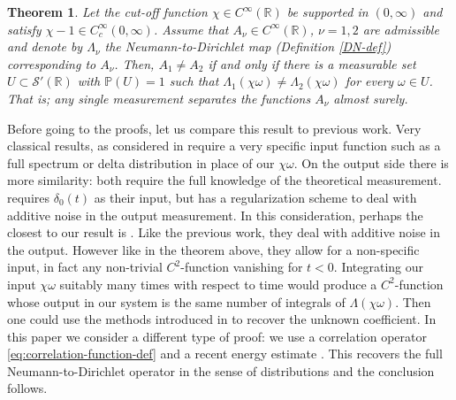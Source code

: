 \documentclass[10pt,a4paper]{article}
\theoremstyle{plain}
\newtheorem{theorem}{Theorem}[section]
\theoremstyle{definition}
\theoremstyle{remark}
\numberwithin{equation}{section}
\newcommand{\R}{\mathbb{R}}
\begin{document}
\begin{theorem}\label{themain}
Let the cut-off function $\chi \in C^\infty( \R)$ be supported in $(0,\infty)$ and satisfy $\chi-1 \in C^\infty_c(0,\infty)$. 
Assume that $A_\nu \in C^\infty(\R)$, $\nu = 1,2$ are admissible and 
denote by ${\Lambda}_{\nu}$ the Neumann-to-Dirichlet map (Definition \ref{DN-def}) corresponding to $ A_\nu$. 
Then, $A_1 \neq A_2$ if and only if there is a measurable set $U \subset \mathcal{S}'(\R)$ with $\mathbb{P}(U) = 1$  such that 
$\Lambda_{1} ( \chi \omega) \neq \Lambda_{2} ( \chi \omega)$ for every $ \omega \in U$. 
That is; any single measurement separates the functions $A_\nu$ almost surely.
\end{theorem}

{ Before going to the proofs, let us compare this result to previous work. Very classical results, as considered in \cite{gelfand55_deter_differ_equat_from_its_spect_funct,sondhi_gopinath} require a very specific input function such as a full spectrum or delta distribution in place of our $\chi \omega$. On the output side there is more similarity: both require the full knowledge of the theoretical measurement. \cite{korpela16_regul_strat_inver_probl_1} requires $\delta_0(t)$ as their input, but has a regularization scheme to deal with additive noise in the output measurement. In this consideration, perhaps the closest to our result is \cite{romanov20_recon_princ_coeff_damped_wave}. Like the previous work, they deal with additive noise in the output. However like in the theorem above, they allow for a non-specific input, in fact any non-trivial $C^2$-function vanishing for $t<0$. Integrating our input $\chi \omega$ suitably many times with respect to time would produce a $C^2$-function whose output in our system is the same number of integrals of $\Lambda(\chi \omega)$. Then one could use the methods introduced in \cite{romanov20_recon_princ_coeff_damped_wave} to recover the unknown coefficient. In this paper we consider a different type of proof: we use a correlation operator \eqref{eq:correlation-function-def} and a recent energy estimate \cite{arnold22_expon_time_decay_one_dimen}. This recovers the full Neumann-to-Dirichlet operator in the sense of distributions and the conclusion follows.}
\end{document}
